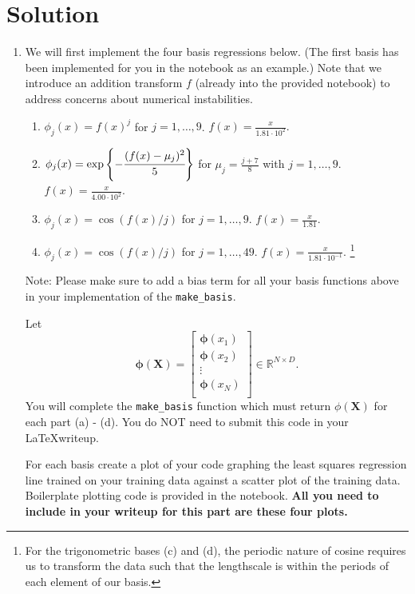 \documentclass[submit]{harvardml}
\newenvironment{solution}
  {\color{blue}\section*{Solution}}
{}
\begin{document}
\begin{solution}
\begin{problem}
\begin{enumerate}
\item 
We will first implement the four basis regressions below. (The first basis has been implemented for you in the notebook as an example.) Note that we introduce an addition transform $f$ (already into the provided notebook) to address concerns about numerical instabilities.
\begin{enumerate}
  \item $\phi_j(x)= f(x)^j$ for $j=1,\ldots, 9$. $f(x) = \frac{x}{1.81 \cdot 10^{2}}.$
  \item $\phi_j(x) = \exp\left\{-\cfrac{(f(x)-\mu_j)^2}{5}\right\}$ for $\mu_j=\frac{j + 7}{8}$ with $j=1,\ldots, 9$. $f(x) = \frac{x}{4.00 \cdot 10^{2}}.$
  \item $\phi_j(x) =  \cos(f(x) / j)$ for $j=1, \ldots, 9$. $f(x) = \frac{x}{1.81}$.
  \item $\phi_j(x) = \cos(f(x) / j)$ for $j=1, \ldots, 49$. $f(x) = \frac{x}{1.81 \cdot 10^{-1}}$. \footnote{For the trigonometric bases (c) and (d), the periodic nature of
cosine requires us to transform the data such that the 
lengthscale is within the periods of each element of our basis.}
\end{enumerate}

{\footnotesize * Note: Please make sure to add a bias term for
all your basis functions above in your implementation of the 
\verb|make_basis|.}

Let 
$$ \mathbf{\phi}(\mathbf{X}) = 
\begin{bmatrix} 
\mathbf{\phi}(x_1) \\
\mathbf{\phi}(x_2) \\
\vdots \\
\mathbf{\phi}(x_N) \\
\end{bmatrix} \in \mathbb{R}^{N\times D}.$$
You will complete the \verb|make_basis| function which must return
$\phi(\mathbf{X})$ for each part 
(a) - (d). You do NOT need to submit this
code in your \LaTeX writeup.

For each basis create a plot of your code graphing the least squares
regression line trained on your training data against a scatter plot
of the training data. Boilerplate plotting code is provided in the
notebook.
\textbf{All you need to include 
in your writeup for this part are these four plots.}
\vspace{1em}
\end{enumerate}
\end{problem}



\end{solution}
\end{document}
